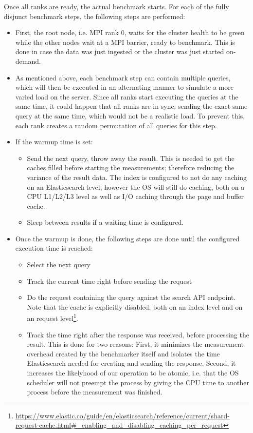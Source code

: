 Once all ranks are ready, the actual benchmark starts. For each of the fully disjunct benchmark steps, the following steps are performed:
\begin{itemize}
  \item First, the root node, i.e. \ac{MPI} rank 0, waits for the cluster health to be green while the other nodes wait at a \ac{MPI} barrier, ready to benchmark. This is done in case the data was just ingested or the cluster was just started on-demand.
  \item As mentioned above, each benchmark step can contain multiple queries, which will then be executed in an alternating manner to simulate a more varied load on the server. Since all ranks start executing the queries at the same time, it could happen that all ranks are in-sync, sending the exact same query at the same time, which would not be a realistic load. To prevent this, each rank creates a random permutation of all queries for this step.
  \item If the warmup time is set:
    \begin{itemize}
      \item Send the next query, throw away the result. This is needed to get the caches filled before starting the measurements; therefore reducing the variance of the result data. The index is configured to not do any caching on an Elasticsearch level, however the OS will still do caching, both on a CPU L1/L2/L3 level as well as I/O caching through the page and buffer cache.
      \item Sleep between results if a waiting time is configured.
    \end{itemize}
  \item Once the warmup is done, the following steps are done until the configured execution time is reached:
    \begin{itemize}
      \item Select the next query
      \item Track the current time right before sending the request
      \item Do the request containing the query against the search API endpoint. Note that the cache is explicitly disabled, both on an index level and on an request level\footnote{\url{https://www.elastic.co/guide/en/elasticsearch/reference/current/shard-request-cache.html\#_enabling_and_disabling_caching_per_request}}.
      \item Track the time right after the response was received, before processing the result. This is done for two reasons: First, it minimizes the measurement overhead created by the benchmarker itself and isolates the time Elasticsearch needed for creating and sending the response. Second, it increases the likelyhood of our operation to be atomic, i.e. that the OS scheduler will not preempt the process by giving the CPU time to another process before the measurement was finished.

\end{itemize}
\end{itemize}
